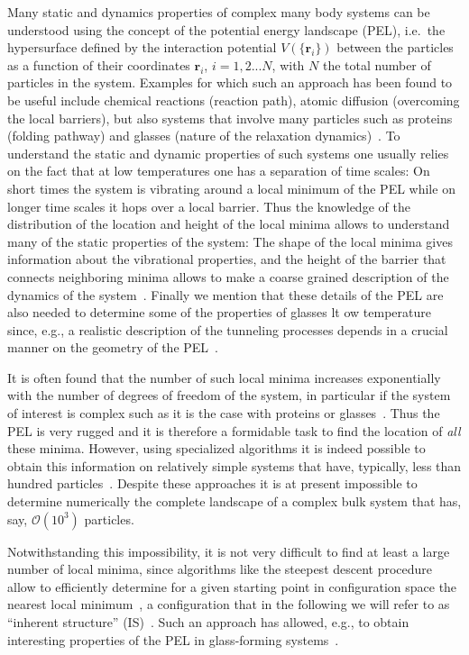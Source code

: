 \documentclass[aip,pre,twocolumn,reprint]{revtex4-1}
\begin{document}
Many static and dynamics properties of complex many body systems can
be understood using the concept of the potential energy landscape
(PEL), i.e.~the hypersurface defined by the interaction potential
$V(\{\mathbf{r}_i\})$ between the particles as a function of their
coordinates $\mathbf{r}_i$, $i=1,2...N$, with $N$ the total number
of particles in the system. Examples for which such an approach has
been found to be useful include chemical reactions (reaction path),
atomic diffusion (overcoming the local barriers), but also systems that
involve many particles such as proteins (folding pathway) and glasses
(nature of the relaxation dynamics)~\cite{wales_book}. To understand
the static and dynamic properties of such systems one usually relies on
the fact that at low temperatures one has a separation of time scales:
On short times the system is vibrating around a local minimum of the
PEL while on longer time scales it hops over a local barrier. Thus the
knowledge of the distribution of the location and height of the local
minima allows to understand many of the static properties of the system:
The shape of the local minima gives information about the vibrational
properties, and the height of the barrier that connects neighboring
minima allows to make a coarse grained description of the dynamics
of the system~\cite{goldstein_1969}. Finally we mention that these
details of the PEL are also needed to determine some of the properties
of glasses lt ow temperature since, e.g., a realistic description of
the tunneling processes depends in a crucial manner on the geometry of
the PEL~\cite{jug2015realistic}.

It is often found that the number of such local minima increases
exponentially with the number of degrees of freedom of the system,
in particular if the system of interest is complex such as it is the
case with proteins or glasses~\cite{stillinger1999exponential}. Thus
the PEL is very rugged and it is therefore a formidable task to find
the location of {\it all} these minima. However, using specialized
algorithms it is indeed possible to obtain this information
on relatively simple systems that have, typically, less than hundred
particles~\cite{wales1994rearrangements,wales_1998,wales2003stationary,doye1999evolution,wales_2015}.
Despite these approaches it is at present impossible to determine
numerically the complete landscape of a complex bulk system that has,
say, $\mathcal{O}(10^3)$ particles.

Notwithstanding this impossibility, it is not very difficult to
find at least a large number of local minima, since algorithms
like the steepest descent procedure allow to efficiently determine
for a given starting point in configuration space the nearest
local minimum~\cite{press1992numerical}, a configuration that
in the following we will refer to as ``inherent structure''
(IS)~\cite{weber1984inherent}. Such an approach has allowed,
e.g., to obtain interesting properties of the PEL in glass-forming
systems~\cite{weber1984inherent,Web1985,heuer1997properties,Sas1998,angelani2000saddles,broderix2000energy,Ang2003,doliwa2003does,Sci2005,wales2003stationary,Heu2008}.
\end{document}
